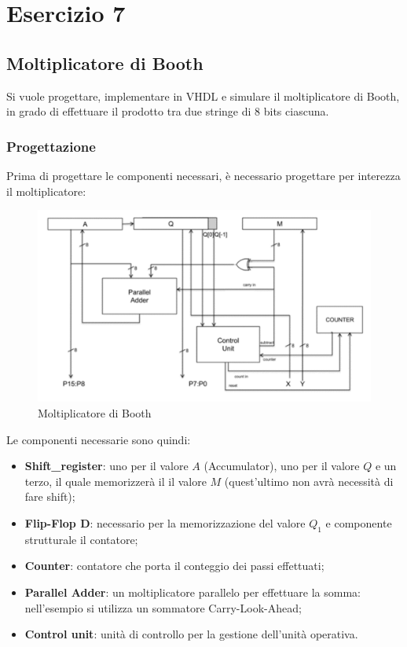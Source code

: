 \chapter{Esercizio 7}
\section{Moltiplicatore di Booth}
 Si vuole progettare, implementare in VHDL e simulare il moltiplicatore di Booth, in grado di effettuare il prodotto tra due stringe di 8 bits ciascuna.
 \subsection{Progettazione}
 Prima di progettare le componenti necessari, è necessario progettare per interezza il moltiplicatore:
\begin{figure}[H]
	\centering
	\includegraphics[width=1\textwidth]{img/Esercizio_7_1/booth_prog}
	\caption{Moltiplicatore di Booth}
	\label{booth_prog} 
\end{figure}

Le componenti necessarie sono quindi:
\begin{itemize}
    \item \textbf{Shift\_register}: uno per il valore $A$ (Accumulator), uno per il valore $Q$ e un terzo, il quale memorizzerà il il valore $M$ (quest'ultimo non avrà necessità di fare shift);
    \item \textbf{Flip-Flop D}: necessario per la memorizzazione del valore $Q_1$ e componente strutturale il contatore;
    \item \textbf{Counter}: contatore che porta il conteggio dei passi effettuati;
    \item \textbf{Parallel Adder}: un moltiplicatore parallelo per effettuare la somma: nell'esempio si utilizza un sommatore Carry-Look-Ahead;
    \item \textbf{Control unit}: unità di controllo per la gestione dell'unità operativa.
\end{itemize}


